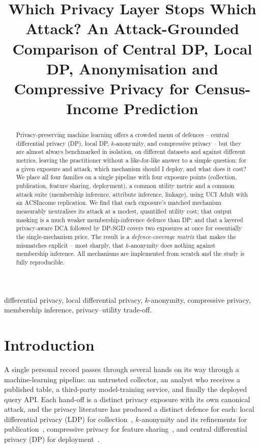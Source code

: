 \documentclass[conference]{IEEEtran}
\begin{document}
\title{Which Privacy Layer Stops Which Attack? An Attack-Grounded Comparison of
Central DP, Local DP, Anonymisation and Compressive Privacy for Census-Income
Prediction}

\author{
}

\maketitle

\begin{abstract}
Privacy-preserving machine learning offers a crowded menu of defences -- central
differential privacy (DP), local DP, $k$-anonymity, and compressive privacy --
but they are almost always benchmarked in isolation, on different datasets and
against different metrics, leaving the practitioner without a like-for-like
answer to a simple question: for a given exposure and attack, which mechanism
should I deploy, and what does it cost? We place all four families on a single
pipeline with four exposure points (collection, publication, feature sharing,
deployment), a common utility metric and a common attack suite (membership
inference, attribute inference, linkage), using UCI Adult with an ACSIncome
replication. We find that each exposure's matched mechanism measurably
neutralises its attack at a modest, quantified utility cost; that output masking
is a much weaker membership-inference defence than DP; and that a layered
privacy-aware DCA followed by DP-SGD covers two exposures at once for essentially
the single-mechanism price. The result is a \emph{defence-coverage matrix} that
makes the mismatches explicit -- most sharply, that $k$-anonymity does nothing
against membership inference. All mechanisms are implemented from scratch and the
study is fully reproducible.
\end{abstract}

\begin{IEEEkeywords}
differential privacy, local differential privacy, $k$-anonymity, compressive
privacy, membership inference, privacy--utility trade-off.
\end{IEEEkeywords}

\section{Introduction}
A single personal record passes through several hands on its way through a
machine-learning pipeline: an untrusted collector, an analyst who receives a
published table, a third-party model-training service, and finally the deployed
query API. Each hand-off is a distinct privacy exposure with its own canonical
attack, and the privacy literature has produced a distinct defence for each:
local differential privacy (LDP) for collection~\cite{duchi2013local,wang2017locally},
$k$-anonymity and its refinements for publication~\cite{sweeney2002kanonymity,machanavajjhala2007ldiversity,li2007tcloseness},
compressive privacy for feature sharing~\cite{kung2017compressive}, and central
differential privacy (DP) for deployment~\cite{dwork2006calibrating,abadi2016deep}.
\end{document}
